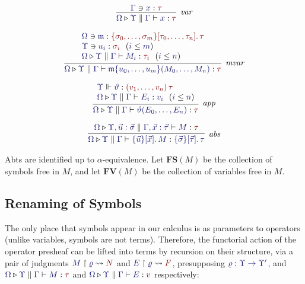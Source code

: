 \documentclass[11pt]{article}
\theoremstyle{definition}
\theoremstyle{remark}
\numberwithin{equation}{section}
\def\IModeColorName{MidnightBlue}
\def\OModeColorName{Maroon}
\newcommand\IMode[1]{{\color{\IModeColorName}{#1}}}
\newcommand\OMode[1]{{\color{\OModeColorName}{#1}}}
\newcommand\HypJ[2]{#1\ \ (#2)}
\newcommand\Of[2]{\IMode{#1}: \IMode{#2}}
\newcommand\MkValence[3]{%
  \ifthenelse{\equal{#1}{}}{}{%
    \{#1\}%
  }%
  \ifthenelse{\equal{#2}{}}{}{%
    [#2]%
  }.\, #3%
}
\newcommand\MkBTm[3]{\{#1\}[#2].\, #3}
\newcommand\MkArity[2]{(#1)\, #2}
\newcommand\Leq[2]{\IMode{#1}\leq\IMode{#2}}
\newcommand\IsOperator[3]{\IMode{#1}\Vdash\IMode{#2}: \OMode{#3}}
\newcommand\Lookup[3]{\IMode{#1}\ni\IMode{#2}:\OMode{#3}}
\newcommand\IsAbt[5]{%
  \IMode{#1}\triangleright%
  \IMode{#2}\parallel%
  \IMode{#3}\vdash%
  \IMode{#4}:\OMode{#5}%
}
\newcommand\IsBTm[5]{%
  \IMode{#1}\triangleright%
  \IMode{#2}\parallel%
  \IMode{#3}\vdash%
  \IMode{#4}:\IMode{#5}%
}
\newcommand\MV[1]{\mathfrak{#1}}
\newcommand\MApp[3]{#1\{#2\}(#3)}
\newcommand\App[2]{#1(#2)}
\newcommand\FV[1]{\mathbf{FV}\left(#1\right)}
\newcommand\FS[1]{\mathbf{FS}\left(#1\right)}
\newcommand\Rename[2]{%
  #2\upharpoonright#1%
}
\newcommand\IsRenaming[3]{%
  \Rename{\IMode{#1}}{\IMode{#2}}%
  \leadsto\OMode{#3}%
}
\begin{document}
\begin{gather*}
  \infer[\textit{var}]{
    \IsAbt{\Omega}{\Upsilon}{\Gamma}{x}{\tau}
  }{
    \Lookup{\Gamma}{x}{\tau}
  }\\[6pt]
  \infer[\textit{mvar}]{
    \IsAbt{\Omega}{\Upsilon}{\Gamma}{
      \MApp{\MV{m}}{u_0,\dots,u_m}{M_0,\dots,M_n}
    }{\tau}
  }{
    \begin{array}{l}
      \Lookup{\Omega}{\MV{m}}{\MkValence{\sigma_0,\dots,\sigma_m}{\tau_0,\dots,\tau_n}{\tau}}\\
      \HypJ{\Lookup{\Upsilon}{u_i}{\sigma_i}}{\Leq{i}{m}}\\
      \HypJ{
        \IsAbt{\Omega}{\Upsilon}{\Gamma}{M_i}{\tau_i}
      }{
        \Leq{i}{n}
      }
    \end{array}
  }\\[6pt]
  \infer[\textit{app}]{
    \IsAbt{\Omega}{\Upsilon}{\Gamma}{
      \App{\vartheta}{E_0,\dots,E_n}
    }{\tau}
  }{
    \begin{array}{l}
      \IsOperator{\Upsilon}{\vartheta}{
        \MkArity{v_1,\dots,v_n}{\tau}
      }\\
      \HypJ{
        \IsBTm{\Omega}{\Upsilon}{\Gamma}{E_i}{v_i}
      }{
        \Leq{i}{n}
      }
    \end{array}
  }\\[6pt]
  \infer[\textit{abs}]{
    \IsBTm{\Omega}{\Upsilon}{\Gamma}{
      \MkBTm{\vec{u}}{\vec{x}}{M}
    }{
      \MkValence{\vec{\sigma}}{\vec{\tau}}{\tau}
    }
  }{
    \IsAbt{\Omega}{\Upsilon, \vec{u}:\vec{\sigma}}{\Gamma,\vec{x}:{\vec{\tau}}}{
      M
    }{
      \tau
    }
  }
\end{gather*}

Abts are identified up to $\alpha$-equivalence. Let $\FS{M}$ be the collection
of symbols free in $M$, and let $\FV{M}$ be the collection of variables free in
$M$. %

\subsection{Renaming of Symbols}

The only place that symbols appear in our calculus is as parameters to
operators (unlike variables, symbols are not terms). Therefore, the functorial
action of the operator presheaf can be lifted into terms by recursion on their
structure, via a pair of judgments $\IsRenaming{\varrho}{M}{N}$ and
$\IsRenaming{\varrho}{E}{F}$, presupposing
$\Of{\varrho}{\Upsilon\to\Upsilon'}$, and $\IsAbt{\Omega}{\Upsilon}{\Gamma}{M}{\tau}$
and $\IsAbt{\Omega}{\Upsilon}{\Gamma}{E}{v}$ respectively:
\end{document}

